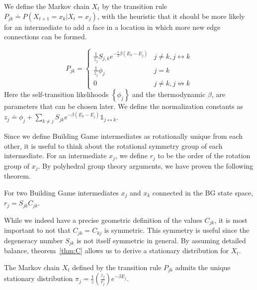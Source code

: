 We define the Markov chain $X_t$ by the transition rule $P_{jk} \doteq P(X_{t+1} = x_k | X_t = x_j)$, with the heuristic that it should be more likely for an intermediate to add a face in a location in which more new edge connections can be formed.


$$
 P_{jk} = \begin{cases}
        \frac{1}{z_j}S_{j,k}e^{-\frac{1}{2}\beta\left(E_k-E_j\right)}  & j \neq k, j \leftrightarrow k \\
        \frac{1}{z_j}\phi_j \label{eq:A} & j = k\\
        0 & j \neq k, j \not\leftrightarrow k 
       \end{cases}
$$
Here the self-transition likelihoods $\left\{\phi_j\right\}$ and the thermodynamic $\beta$, are parameters that can be chosen later. We define the normalization constants as $z_j \doteq \phi_j + \sum_{k\neq j}S_{jk}e^{-\beta\left(E_k-E_j\right)}\mathbb{1}_{j\leftrightarrow k}$. 


Since we define Building Game intermediates as rotationally unique from each other, it is useful to think about the rotational symmetry group of each intermediate. For an intermediate $x_j$, we define $r_j$ to be the order of the rotation group of $x_j$. By polyhedral group theory arguments, we have proven the following theorem.
\begin{mythm}
\label{thm:C}
For two Building Game intermediates $x_j$ and $x_k$ connected in the BG state space, $r_j = S_{jk}C_{jk}$.
\end{mythm}
While we indeed have a precise geometric definition of the values $C_{jk}$, it is most important to not that $C_{jk} = C_{kj}$ is symmetric. This symmetry is useful since the degeneracy number $S_{jk}$ is not itself symmetric in general. By assuming detailed balance, theorem~\ref{thm:C} allows us to derive a stationary distribution for $X_t$.
\begin{mythm}
The Markov chain $X_t$ defined by the transition rule $P_{jk}$ admits the unique stationary distribution $\pi_j = \frac{1}{z}\left(\frac{z_j}{r_j}\right)e^{-\beta E_j}$. 
\end{mythm}

